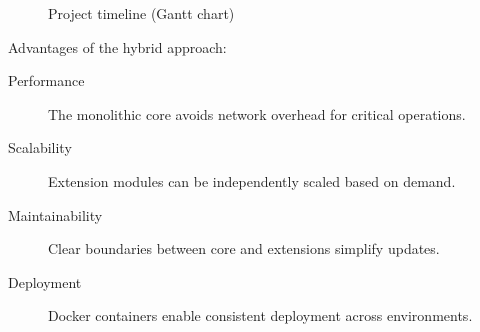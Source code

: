 \begin{figure}[htbp]
  \centering
  \caption{Project timeline (Gantt chart)}\label{fig:timeline}
\end{figure}

Advantages of the hybrid approach:
\begin{description}
  \item[Performance] The monolithic core avoids network overhead for critical operations.
  \item[Scalability] Extension modules can be independently scaled based on demand.
  \item[Maintainability] Clear boundaries between core and extensions simplify updates.
  \item[Deployment] Docker containers enable consistent deployment across environments.
\end{description}

